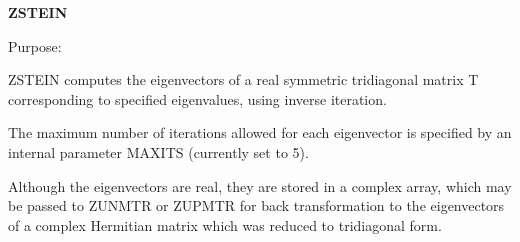 {\bfseries Z\+S\+T\+E\+I\+N} 

 \begin{DoxyParagraph}{Purpose\+: }
\begin{DoxyVerb} ZSTEIN computes the eigenvectors of a real symmetric tridiagonal
 matrix T corresponding to specified eigenvalues, using inverse
 iteration.

 The maximum number of iterations allowed for each eigenvector is
 specified by an internal parameter MAXITS (currently set to 5).

 Although the eigenvectors are real, they are stored in a complex
 array, which may be passed to ZUNMTR or ZUPMTR for back
 transformation to the eigenvectors of a complex Hermitian matrix
 which was reduced to tridiagonal form.\end{DoxyVerb}
 
\end{DoxyParagraph}

